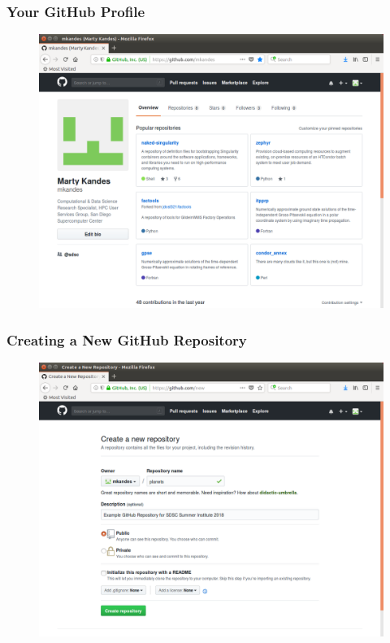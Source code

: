 \documentclass{beamer}
\begin{document}
\begin{frame}
   \frametitle{Your GitHub Profile}
   \begin{figure}[htbp]
      \includegraphics[width=1.0\textwidth]{images/my-github-repo.png}
   \end{figure}
\end{frame}

\begin{frame}
   \frametitle{Creating a New GitHub Repository}
   \begin{figure}[htbp]
      \includegraphics[width=1.0\textwidth]{images/github-create-new-repo.png}
   \end{figure}
\end{frame}
\end{document}
